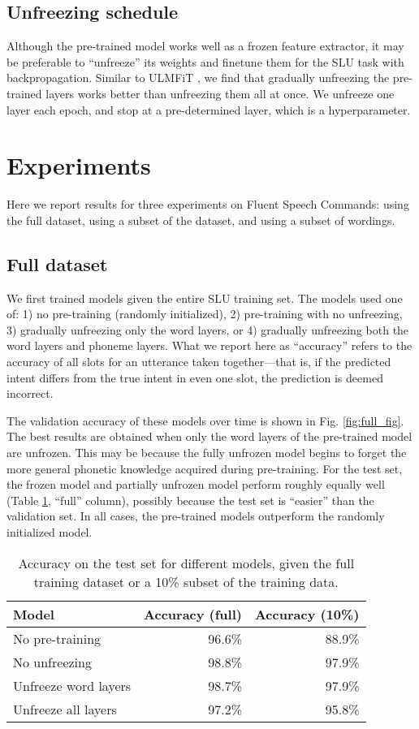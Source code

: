 \documentclass[a4paper]{article}
\begin{document}
\subsection{Unfreezing schedule}
Although the pre-trained model works well as a frozen feature extractor, it may be preferable to ``unfreeze'' its weights and finetune them for the SLU task with backpropagation. Similar to ULMFiT \cite{howard2018universal}, we find that gradually unfreezing the pre-trained layers works better than unfreezing them all at once. 
We unfreeze one layer each epoch, and stop at a pre-determined layer, which is a hyperparameter.

\section{Experiments}
Here we report results for three experiments on Fluent Speech Commands: using the full dataset, using a subset of the dataset, and using a subset of wordings.

\subsection{Full dataset}
We first trained models given the entire SLU training set. The models used one of: 1) no pre-training (randomly initialized), 2) pre-training with no unfreezing, 3) gradually unfreezing only the word layers, or 4) gradually unfreezing both the word layers and phoneme layers. What we report here as ``accuracy'' refers to the accuracy of all slots for an utterance taken together---that is, if the predicted intent differs from the true intent in even one slot, the prediction is deemed incorrect.

The validation accuracy of these models over time is shown in Fig. \ref{fig:full_fig}. The best results are obtained when only the word layers of the pre-trained model are unfrozen. This may be because the fully unfrozen model begins to forget the more general phonetic knowledge acquired during pre-training. For the test set, the frozen model and partially unfrozen model perform roughly equally well (Table \ref{tab:test_results}, ``full'' column), possibly because the test set is ``easier'' than the validation set. In all cases, the pre-trained models outperform the randomly initialized model. 

\begin{table}[]
  \caption{Accuracy on the test set for different models, given the full training dataset or a 10\% subset of the training data.}
  \label{tab:test_results}
  \centering
  \begin{tabular}{l r r}
    \toprule
    \textbf{Model} & \textbf{Accuracy (full)} & \textbf{Accuracy (10\%)} \\
    \midrule
    No pre-training & 96.6\% & 88.9\% \\
    No unfreezing  & 98.8\% & 97.9\% \\
    Unfreeze word layers  & 98.7\%      & 97.9\% \\
    Unfreeze all layers  & 97.2\%  & 95.8\%   \\
    \bottomrule
  \end{tabular}
  
\end{table}
\end{document}
